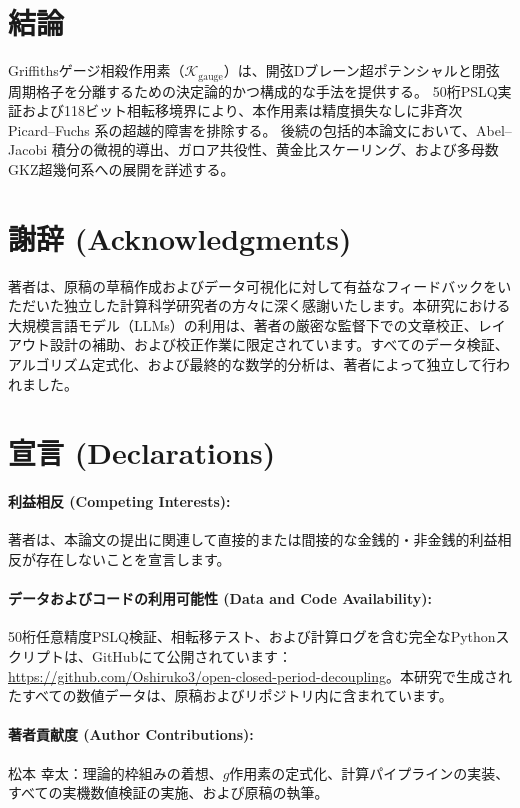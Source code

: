 \documentclass[11pt,a4paper]{article}
\theoremstyle{definition}
\begin{document}
\section{結論}

Griffithsゲージ相殺作用素（$\mathcal{K}_{\text{gauge}}$）は、開弦Dブレーン超ポテンシャルと閉弦周期格子を分離するための決定論的かつ構成的な手法を提供する。
50桁PSLQ実証および118ビット相転移境界により、本作用素は精度損失なしに非斉次 Picard--Fuchs 系の超越的障害を排除する。
後続の包括的本論文において、Abel--Jacobi 積分の微視的導出、ガロア共役性、黄金比スケーリング、および多母数GKZ超幾何系への展開を詳述する。

\section*{謝辞 (Acknowledgments)}
著者は、原稿の草稿作成およびデータ可視化に対して有益なフィードバックをいただいた独立した計算科学研究者の方々に深く感謝いたします。本研究における大規模言語モデル（LLMs）の利用は、著者の厳密な監督下での文章校正、レイアウト設計の補助、および校正作業に限定されています。すべてのデータ検証、アルゴリズム定式化、および最終的な数学的分析は、著者によって独立して行われました。

\section*{宣言 (Declarations)}

\paragraph{利益相反 (Competing Interests):}
著者は、本論文の提出に関連して直接的または間接的な金銭的・非金銭的利益相反が存在しないことを宣言します。

\paragraph{データおよびコードの利用可能性 (Data and Code Availability):}
50桁任意精度PSLQ検証、相転移テスト、および計算ログを含む完全なPythonスクリプトは、GitHubにて公開されています：\\
\url{https://github.com/Oshiruko3/open-closed-period-decoupling}。本研究で生成されたすべての数値データは、原稿およびリポジトリ内に含まれています。

\paragraph{著者貢献度 (Author Contributions):}
松本 幸太：理論的枠組みの着想、$g$作用素の定式化、計算パイプラインの実装、すべての実機数値検証の実施、および原稿の執筆。
\end{document}
